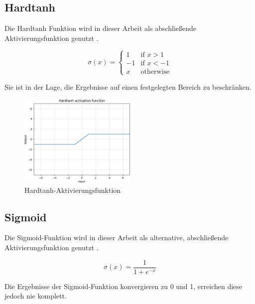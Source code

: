 \subsection{Hardtanh}
\label{sec:hardtanh}

Die Hardtanh Funktion wird in dieser Arbeit als abschließende Aktivierungsfunktion genutzt \cite{DBLP:journals/corr/abs-1811-03378, Collobert:2011:NLP:1953048.2078186}.

\begin{equation}
	\sigma(x) = {
		\begin{cases}
			1  & {\text{if }} x > 1 \\ 
			-1 & {\text{if }} x < -1 \\
			x  & {\text{otherwise}}
		\end{cases}
	 }
\end{equation}

\pagebreak

Sie ist in der Lage, die Ergebnisse auf einen festgelegten Bereich zu beschränken.

\begin{figure}[H]
	\centering
	\includegraphics[width=0.50\textwidth]{resources/content/Hardtanh.png}
	\caption{Hardtanh-Aktivierungsfunktion \cite{hardtanh_activation_function_img}}
	\label{img:hardtanh_activation_function}
\end{figure}

\subsection{Sigmoid}
\label{sec:sigmoid}

Die Sigmoid-Funktion wird in dieser Arbeit als alternative, abschließende Aktivierungsfunktion genutzt \cite{DBLP:journals/corr/abs-1811-03378}.

\begin{equation}
	\sigma(x) = \frac{ 1 } { 
		1 + e^{ -x }
	}
\end{equation}

Die Ergebnisse der Sigmoid-Funktion konvergieren zu 0 und 1, erreichen diese jedoch nie komplett.

